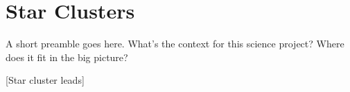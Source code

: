 %
%
%
%
%
%
%
%

\section{Star Clusters}
\def\secname{starclusters}\label{sec:\secname} %



A short preamble goes here. What's the context for this science
project? Where does it fit in the big picture?

[Star cluster leads]



